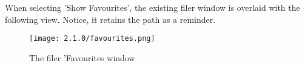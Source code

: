 
   When selecting 'Show Favourites', the existing filer window
   is overlaid with the
   following view. Notice, it retains the path as a reminder.

   \begin{figure}[H]
      \centering
      \texttt{[image: 2.1.0/favourites.png]}
      \caption{The filer 'Favourites window}
      \label{fig:filer_favourites_window}
   \end{figure}

